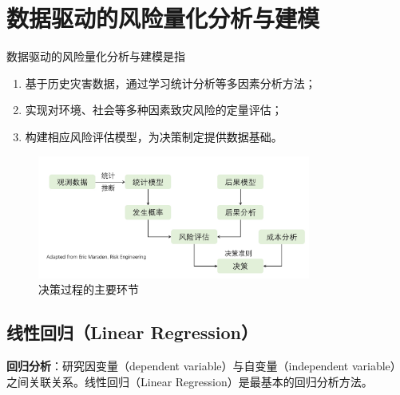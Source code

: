 \chapter{数据驱动的风险量化分析与建模}

数据驱动的风险量化分析与建模是指
\begin{enumerate}[itemsep=0pt,parsep=0pt]
    \item 基于历史灾害数据，通过学习统计分析等多因素分析方法；
    \item 实现对环境、社会等多种因素致灾风险的定量评估；
    \item 构建相应风险评估模型，为决策制定提供数据基础。
\end{enumerate}

\begin{figure}[ht]
    \centering
    \includegraphics[width=0.8\textwidth]{pic/2.0.1.png}
    \caption{决策过程的主要环节}
\end{figure}


\section{线性回归（Linear Regression）}

\textbf{回归分析}：研究因变量（dependent variable）与自变量（independent variable）之间关联关系。线性回归（Linear Regression）是最基本的回归分析方法。

